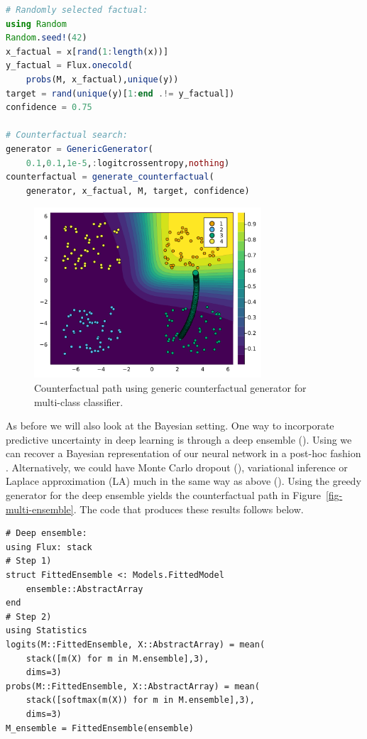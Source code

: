 \documentclass{juliacon}
\begin{document}
\begin{lstlisting}[language = Julia]
# Randomly selected factual:
using Random
Random.seed!(42)
x_factual = x[rand(1:length(x))]
y_factual = Flux.onecold(
    probs(M, x_factual),unique(y))
target = rand(unique(y)[1:end .!= y_factual]) 
confidence = 0.75

# Counterfactual search:
generator = GenericGenerator(
    0.1,0.1,1e-5,:logitcrossentropy,nothing)
counterfactual = generate_counterfactual(
    generator, x_factual, M, target, confidence)
\end{lstlisting}

\begin{figure}

{\centering \includegraphics[width=3.33333in,height=2.5in]{www/ce_multi.png}

}

\caption{\label{fig-multi}Counterfactual path using generic
counterfactual generator for multi-class classifier.}

\end{figure}

As before we will also look at the Bayesian setting. One way to
incorporate predictive uncertainty in deep learning is through a deep
ensemble (\cite{lakshminarayanan2016simple}). Using we can recover a
Bayesian representation of our neural network in a post-hoc fashion .
Alternatively, we could have Monte Carlo dropout
(\cite{gal2016dropout}), variational inference or Laplace approximation
(LA) much in the same way as above (\cite{daxberger2021laplace}). Using
the greedy generator for the deep ensemble yields the counterfactual
path in Figure~\ref{fig-multi-ensemble}. The code that produces these
results follows below.

\begin{lstlisting}
# Deep ensemble:
using Flux: stack
# Step 1)
struct FittedEnsemble <: Models.FittedModel
    ensemble::AbstractArray
end
# Step 2)
using Statistics
logits(M::FittedEnsemble, X::AbstractArray) = mean(
    stack([m(X) for m in M.ensemble],3), 
    dims=3)
probs(M::FittedEnsemble, X::AbstractArray) = mean(
    stack([softmax(m(X)) for m in M.ensemble],3),
    dims=3)
M_ensemble = FittedEnsemble(ensemble)
\end{lstlisting}
\end{document}
